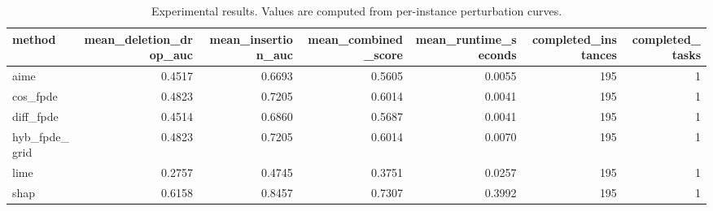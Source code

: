 \begin{table}[t]
\caption{Experimental results. Values are computed from per-instance perturbation curves.}
\label{tab:main_results_computed}
\centering
\begin{tabular}{lrrrrrr}
\toprule
method & mean\_deletion\_drop\_auc & mean\_insertion\_auc & mean\_combined\_score & mean\_runtime\_seconds & completed\_instances & completed\_tasks \\
\midrule
aime & 0.4517 & 0.6693 & 0.5605 & 0.0055 & 195 & 1 \\
cos\_fpde & 0.4823 & 0.7205 & 0.6014 & 0.0041 & 195 & 1 \\
diff\_fpde & 0.4514 & 0.6860 & 0.5687 & 0.0041 & 195 & 1 \\
hyb\_fpde\_grid & 0.4823 & 0.7205 & 0.6014 & 0.0070 & 195 & 1 \\
lime & 0.2757 & 0.4745 & 0.3751 & 0.0257 & 195 & 1 \\
shap & 0.6158 & 0.8457 & 0.7307 & 0.3992 & 195 & 1 \\
\bottomrule
\end{tabular}

\end{table}
